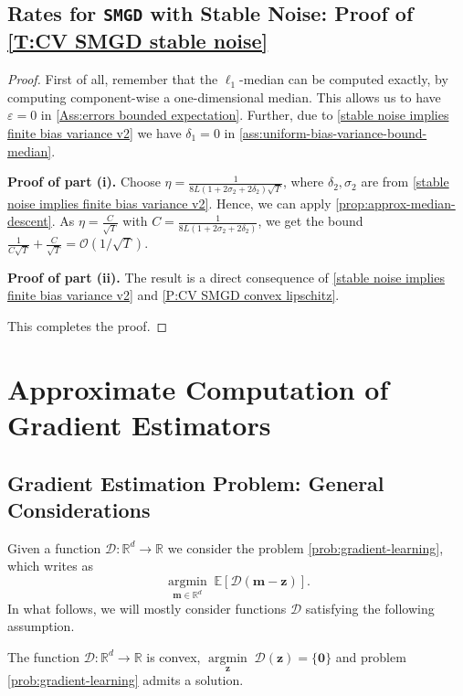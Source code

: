 \documentclass[10pt]{article} %
\renewcommand{\vec}[1]{\bm{#1}}
\DeclareMathOperator{\argmininn}{argmin}
\newcommand{\argmin}[1]{ \underset{#1}{\argmininn} \;}
\newcommand{\R}{\mathbb{R}}
\newcommand{\E}[1]{\mathbb{E}\left[#1\right] }
\newcommand{\dist}{\mathcal{D}}
\newcommand{\SMGD}{\texttt{SMGD}}
\begin{document}
\subsection{Rates for \SMGD{} with Stable Noise: Proof of \cref{T:CV SMGD stable noise}}

%
\corstableshort*

\begin{proof}
First of all, remember that the $\ell_1$-median can be computed exactly, by computing component-wise a one-dimensional median.
This allows us to have $\varepsilon =0$ in \cref{Ass:errors bounded expectation}. Further, due to \cref{stable noise implies finite bias variance v2} we have $\delta_1=0$ in \cref{ass:uniform-bias-variance-bound-median}.

\textbf{Proof of part (i).} Choose $\eta = \frac{1}{8L(1+2\sigma_2+2\delta_2)\sqrt{T}}$, where $\delta_2,\sigma_2$ are from \cref{stable noise implies finite bias variance v2}. Hence, we can apply \cref{prop:approx-median-descent}. As $\eta = \frac{C}{\sqrt{T}}$ with $C=\frac{1}{8L(1+2\sigma_2+2\delta_2)}$, we get the bound $\frac{1}{C\sqrt{T}} + \frac{C}{\sqrt{T}} = \mathcal{O}(1/\sqrt{T})$.

\textbf{Proof of part (ii).}  The result is a direct consequence of \cref{stable noise implies finite bias variance v2} and \cref{P:CV SMGD convex lipschitz}.

This completes the proof.
\end{proof}



\section{Approximate Computation of Gradient Estimators}\label{sec:app-more-update-formulas}
%
\subsection{Gradient Estimation Problem: General Considerations}
%
Given a function $\dist: \R^d \to \R$ we consider the problem \eqref{prob:gradient-learning}, which writes as 
\begin{equation*}
   \argmin{\vec{m} \in \R^d} \E{ \dist(\vec{m}-\vec{z})}.
\end{equation*}
In what follows, we will mostly consider functions $\dist$ satisfying the following assumption.

\begin{assumption}\label{Ass:D convex has solutions}
    The function $\dist : \mathbb{R}^d \to \mathbb{R}$ is convex, $\argmin{\vec{z}} \mathcal{D}(\vec{z})= \{\vec{0}\}$ and problem \eqref{prob:gradient-learning} admits a solution.
\end{assumption}
\end{document}
